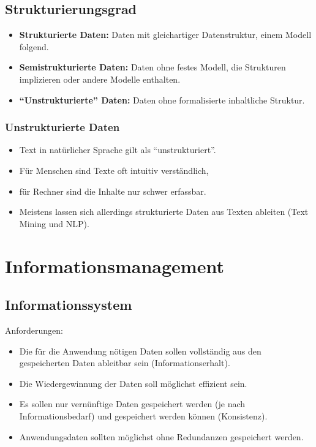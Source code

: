 \documentclass[a4paper, 11pt, accentcolor = tud3b]{tudreport}
\begin{document}
            \subsection{Strukturierungsgrad} %
                \begin{itemize}
                	\item \textbf{Strukturierte Daten:} Daten mit gleichartiger Datenstruktur, einem Modell folgend.
                	\item \textbf{Semistrukturierte Daten:} Daten ohne festes Modell, die Strukturen implizieren oder andere Modelle enthalten.
                	\item \textbf{\enquote{Unstrukturierte} Daten:} Daten ohne formalisierte inhaltliche Struktur.
                \end{itemize}

                \subsubsection{Unstrukturierte Daten} %
                    \begin{itemize}
                    	\item Text in natürlicher Sprache gilt als \enquote{unstrukturiert}.
                    	\item Für Menschen sind Texte oft intuitiv verständlich,
                    	\item für Rechner sind die Inhalte nur schwer erfassbar.
                    	\item Meistens lassen sich allerdings strukturierte Daten aus Texten ableiten (Text Mining und NLP).
                    \end{itemize}

        \section{Informationsmanagement} %
            \subsection{Informationssystem} %
            	Anforderungen:
                \begin{itemize}
                	\item Die für die Anwendung nötigen Daten sollen vollständig aus den gespeicherten Daten ableitbar sein (Informationserhalt).
                	\item Die Wiedergewinnung der Daten soll möglichst effizient sein.
                	\item Es sollen nur vernünftige Daten gespeichert werden (je nach Informationsbedarf) und gespeichert werden können (Konsistenz).
                	\item Anwendungsdaten sollten möglichst ohne Redundanzen gespeichert werden.
                \end{itemize}
\end{document}

